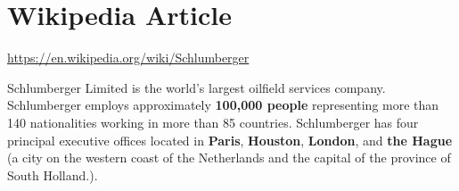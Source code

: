 \documentclass[12pt,a4paper]{article}
\begin{document}


%



\section{Wikipedia Article}

\url{https://en.wikipedia.org/wiki/Schlumberger}

Schlumberger Limited is the world's largest oilfield services company.
Schlumberger employs approximately \textbf{100,000 people} representing more
than 140 nationalities working in more than 85 countries. Schlumberger has
four principal executive offices located in \textbf{Paris},
\textbf{Houston}, \textbf{London}, and \textbf{the Hague} (a city on the
western coast of the Netherlands and the capital of the province of South
Holland.).
\end{document}
